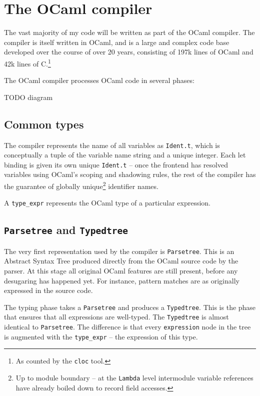 \documentclass[12pt,a4paper,twoside,openright]{report}
\begin{document}
\section{The OCaml compiler}

The vast majority of my code will be written as part of the OCaml compiler. The compiler is itself written in OCaml, and is a large and complex code base developed over the course of over 20 years, consisting of 197k lines of OCaml and 42k lines of C.\footnote{As counted by the \lstinline!cloc! tool.}

The OCaml compiler processes OCaml code in several phases:

TODO diagram

\subsection{Common types}\label{common-types}

The compiler represents the name of all variables as \lstinline!Ident.t!, which
is conceptually a tuple of the variable name string and a unique integer. Each
let binding is given its own unique \lstinline!Ident.t! -- once the frontend
has resolved variables using OCaml's scoping and shadowing rules, the rest of
the compiler has the guarantee of globally unique\footnote{Up to module
boundary -- at the \lstinline!Lambda! level intermodule variable references
have already boiled down to record field accesses.} identifier names.

A \lstinline!type_expr! represents the OCaml type of a particular expression.

\subsection{\texttt{Parsetree} and \texttt{Typedtree}}

The very first representation used by the compiler is \lstinline!Parsetree!.
This is an Abstract Syntax Tree produced directly from the OCaml source code by
the parser. At this stage all original OCaml features are still present, before
any desugaring has happened yet. For instance, pattern matches are as
originally expressed in the source code.

The typing phase takes a \lstinline!Parsetree! and produces a
\lstinline!Typedtree!. This is the phase that ensures that all expressions are
well-typed. The \lstinline!Typedtree! is almost identical to
\lstinline!Parsetree!. The difference is that every \lstinline!expression! node
in the tree is augmented with the \lstinline!type_expr! -- the expression of
this type.
\end{document}
